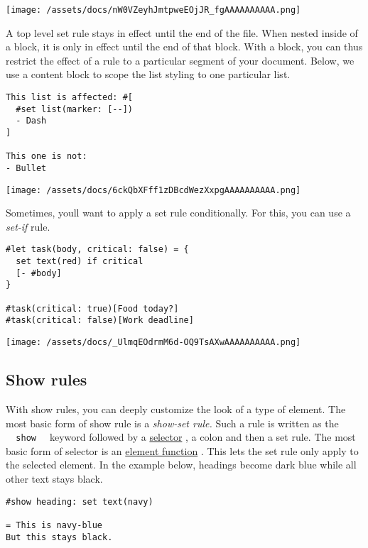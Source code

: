 \texttt{[image: /assets/docs/nW0VZeyhJmtpweEOjJR\_fgAAAAAAAAAA.png]}

A top level set rule stays in effect until the end of the file. When
nested inside of a block, it is only in effect until the end of that
block. With a block, you can thus restrict the effect of a rule to a
particular segment of your document. Below, we use a content block to
scope the list styling to one particular list.

\begin{verbatim}
This list is affected: #[
  #set list(marker: [--])
  - Dash
]

This one is not:
- Bullet
\end{verbatim}

\texttt{[image: /assets/docs/6ckQbXFff1zDBcdWezXxpgAAAAAAAAAA.png]}

Sometimes, you\textquotesingle ll want to apply a set rule
conditionally. For this, you can use a \emph{set-if} rule.

\begin{verbatim}
#let task(body, critical: false) = {
  set text(red) if critical
  [- #body]
}

#task(critical: true)[Food today?]
#task(critical: false)[Work deadline]
\end{verbatim}

\texttt{[image: /assets/docs/\_UlmqEOdrmM6d-OQ9TsAXwAAAAAAAAAA.png]}

\subsection{Show rules}\label{show-rules}

With show rules, you can deeply customize the look of a type of element.
The most basic form of show rule is a \emph{show-set rule.} Such a rule
is written as the \texttt{\ }{\texttt{\ show\ }}\texttt{\ } keyword
followed by a \href{/docs/reference/foundations/selector/}{selector} , a
colon and then a set rule. The most basic form of selector is an
\href{/docs/reference/foundations/function/\#element-functions}{element
function} . This lets the set rule only apply to the selected element.
In the example below, headings become dark blue while all other text
stays black.

\begin{verbatim}
#show heading: set text(navy)

= This is navy-blue
But this stays black.
\end{verbatim}


